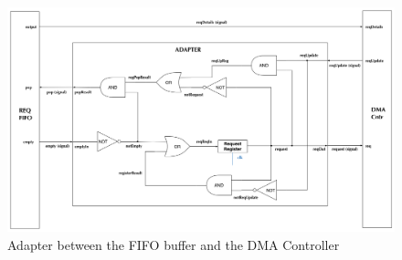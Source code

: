 \begin{appendix}
\begin{figure}[htb]
    \centering
    \includegraphics[width=1.0\textwidth]{Figures/DMA/Adapter}
    \caption{Adapter between the FIFO buffer and the DMA Controller}
    \label{fig:adapter}
\end{figure}


\end{appendix}
